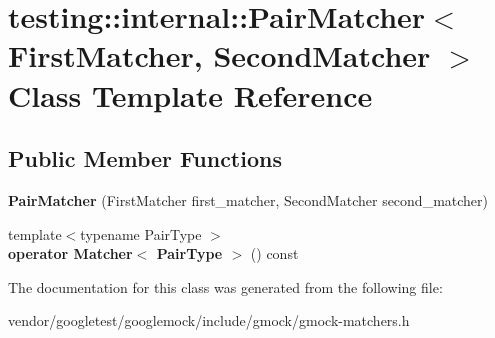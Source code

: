 \hypertarget{classtesting_1_1internal_1_1PairMatcher}{}\section{testing\+:\+:internal\+:\+:Pair\+Matcher$<$ First\+Matcher, Second\+Matcher $>$ Class Template Reference}
\label{classtesting_1_1internal_1_1PairMatcher}
\subsection*{Public Member Functions}
\begin{DoxyCompactItemize}
\item 
{\bfseries Pair\+Matcher} (First\+Matcher first\+\_\+matcher, Second\+Matcher second\+\_\+matcher)\hypertarget{classtesting_1_1internal_1_1PairMatcher_a84f233a7d90ba33e3f0eb7410783c43c}{}\label{classtesting_1_1internal_1_1PairMatcher_a84f233a7d90ba33e3f0eb7410783c43c}

\item 
{\footnotesize template$<$typename Pair\+Type $>$ }\\{\bfseries operator Matcher$<$ Pair\+Type $>$} () const \hypertarget{classtesting_1_1internal_1_1PairMatcher_ab8b41dddcbb254e2c8b4374da6423d42}{}\label{classtesting_1_1internal_1_1PairMatcher_ab8b41dddcbb254e2c8b4374da6423d42}

\end{DoxyCompactItemize}


The documentation for this class was generated from the following file\+:\begin{DoxyCompactItemize}
\item 
vendor/googletest/googlemock/include/gmock/gmock-\/matchers.\+h\end{DoxyCompactItemize}
